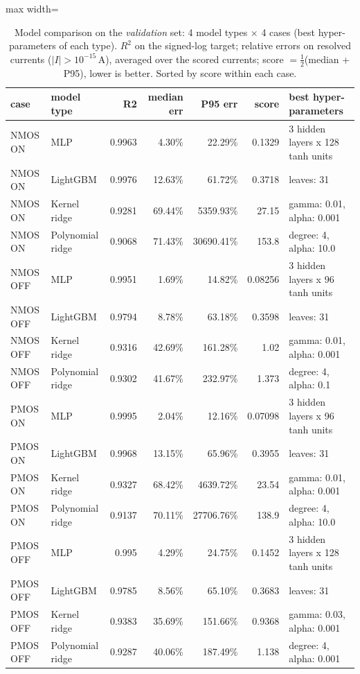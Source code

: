 \begin{table}[H]
\centering
{\small
\begin{adjustbox}{max width=\linewidth}
\begin{tabular}{llrrrrl}
\toprule
case & model type & R2 & median err & P95 err & score & best hyper-parameters \\
\midrule
NMOS ON & MLP & 0.9963 & 4.30\% & 22.29\% & 0.1329 & 3 hidden layers x 128 tanh units \\
NMOS ON & LightGBM & 0.9976 & 12.63\% & 61.72\% & 0.3718 & leaves: 31 \\
NMOS ON & Kernel ridge & 0.9281 & 69.44\% & 5359.93\% & 27.15 & gamma: 0.01, alpha: 0.001 \\
NMOS ON & Polynomial ridge & 0.9068 & 71.43\% & 30690.41\% & 153.8 & degree: 4, alpha: 10.0 \\
NMOS OFF & MLP & 0.9951 & 1.69\% & 14.82\% & 0.08256 & 3 hidden layers x 96 tanh units \\
NMOS OFF & LightGBM & 0.9794 & 8.78\% & 63.18\% & 0.3598 & leaves: 31 \\
NMOS OFF & Kernel ridge & 0.9316 & 42.69\% & 161.28\% & 1.02 & gamma: 0.01, alpha: 0.001 \\
NMOS OFF & Polynomial ridge & 0.9302 & 41.67\% & 232.97\% & 1.373 & degree: 4, alpha: 0.1 \\
PMOS ON & MLP & 0.9995 & 2.04\% & 12.16\% & 0.07098 & 3 hidden layers x 96 tanh units \\
PMOS ON & LightGBM & 0.9968 & 13.15\% & 65.96\% & 0.3955 & leaves: 31 \\
PMOS ON & Kernel ridge & 0.9327 & 68.42\% & 4639.72\% & 23.54 & gamma: 0.01, alpha: 0.001 \\
PMOS ON & Polynomial ridge & 0.9137 & 70.11\% & 27706.76\% & 138.9 & degree: 4, alpha: 10.0 \\
PMOS OFF & MLP & 0.995 & 4.29\% & 24.75\% & 0.1452 & 3 hidden layers x 128 tanh units \\
PMOS OFF & LightGBM & 0.9785 & 8.56\% & 65.10\% & 0.3683 & leaves: 31 \\
PMOS OFF & Kernel ridge & 0.9383 & 35.69\% & 151.66\% & 0.9368 & gamma: 0.03, alpha: 0.001 \\
PMOS OFF & Polynomial ridge & 0.9287 & 40.06\% & 187.49\% & 1.138 & degree: 4, alpha: 0.001 \\
\bottomrule
\end{tabular}
\end{adjustbox}
}
\caption{Model comparison on the \emph{validation} set: 4 model types $\times$ 4 cases (best hyper-parameters of each type). $R^2$ on the signed-log target; relative errors on resolved currents ($|I|>10^{-15}$\,A), averaged over the scored currents; score $=\frac12$(median + P95), lower is better. Sorted by score within each case.}
\label{tab:comparison}
\end{table}

